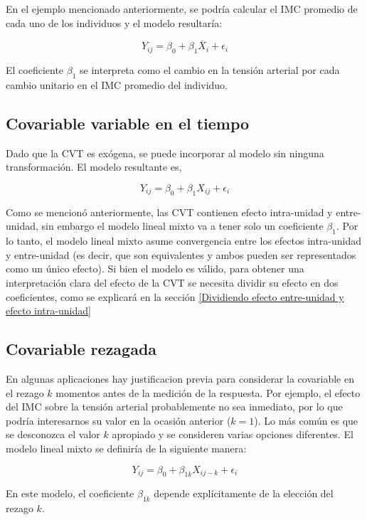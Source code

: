 \documentclass[spanish]{article}
\numberwithin{figure}{subsection}
\numberwithin{equation}{subsection}
\numberwithin{table}{subsection}
\begin{document}
En el ejemplo mencionado anteriormente, se podría calcular el IMC promedio de
cada uno de los individuos y el modelo resultaría:

\[ Y_{ij} = \beta_0 + \beta_1 \overline{X}_i + \epsilon_{i} \]

El coeficiente $\beta_1$ se interpreta como el cambio en la tensión arterial por
cada cambio unitario en el IMC promedio del individuo.

\subsection{Covariable variable en el tiempo}

Dado que la CVT es exógena, se puede incorporar al modelo sin ninguna
transformación. El modelo resultante es,

\[ Y_{ij} = \beta_0 + \beta_1 X_{ij} + \epsilon_{i} \]

Como se mencionó anteriormente, las CVT contienen efecto intra-unidad y
entre-unidad, sin embargo el modelo lineal mixto va a tener solo un coeficiente
$\beta_1$. Por lo tanto, el modelo lineal mixto asume convergencia entre los efectos
intra-unidad y entre-unidad (es decir, que son equivalentes y ambos pueden ser
representados como un único efecto). Si bien el modelo es válido, para obtener
una interpretación clara del efecto de la CVT se necesita dividir su efecto en
dos coeficientes, como se explicará en la sección \ref{Dividiendo efecto
entre-unidad y efecto intra-unidad}


\subsection{Covariable rezagada}

En algunas aplicaciones hay justificacion previa para considerar la covariable
en el rezago $k$ momentos antes de la medición de la respuesta. Por ejemplo, el
efecto del IMC sobre la tensión arterial probablemente no sea inmediato, por lo
que podría interesarnos su valor en la ocasión anterior ($k=1$). Lo más común es
que se desconozca el valor $k$ apropiado y se consideren varias opciones
diferentes. El modelo lineal mixto se definiría de la siguiente manera:

\[ Y_{ij} = \beta_0 + \beta_{1k} X_{ij-k} + \epsilon_{i} \]

En este modelo, el coeficiente $\beta_{1k}$ depende explícitamente de la
elección del rezago $k$.
\end{document}
